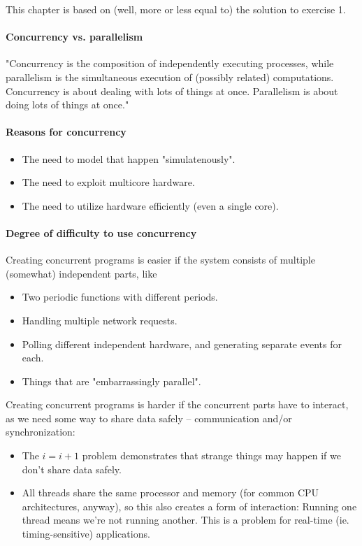 
This chapter is based on (well, more or less equal to) the solution to exercise 1.

\sepline

\paragraph{Concurrency vs. parallelism} "Concurrency is the composition of independently executing processes, while parallelism is the simultaneous execution of (possibly related) computations. Concurrency is about dealing with lots of things at once. Parallelism is about doing lots of things at once."

\paragraph{Reasons for concurrency}
\begin{itemize}[nolistsep,noitemsep]
	\item The need to model that happen "simulatenously".
	\item The need to exploit multicore hardware.
	\item The need to utilize hardware efficiently (even a single core).
\end{itemize}

\paragraph{Degree of difficulty to use concurrency}
Creating concurrent programs is easier if the system consists of multiple (somewhat) independent parts, like
\begin{itemize}[nolistsep,noitemsep]
	\item Two periodic functions with different periods.
	\item Handling multiple network requests.
	\item Polling different independent hardware, and generating separate events for each.
	\item Things that are "embarrassingly parallel".
\end{itemize}

Creating concurrent programs is harder if the concurrent parts have to interact, as we need some way to share data safely -- communication and/or synchronization:
\begin{itemize}
	\item The $i=i+1$ problem demonstrates that strange things may happen if we don't share data safely.
	\item All threads share the same processor and memory (for common CPU architectures, anyway), so this also creates a form of interaction: Running one thread means we're not running another. This is a problem for real-time (ie. timing-sensitive) applications.
\end{itemize}

